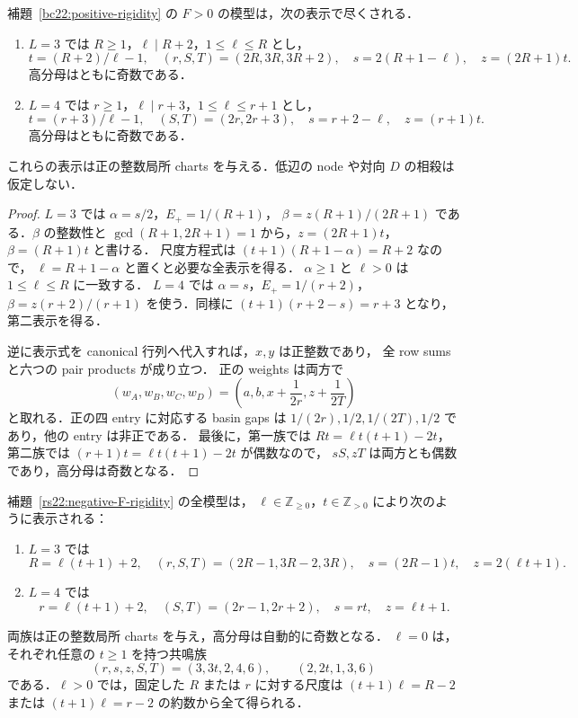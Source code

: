 \begin{proposition}[正枝の全尺度]
\label{rs22:positive-scales}
補題~\ref{bc22:positive-rigidity} の $F>0$ の模型は，次の表示で尽くされる．
\begin{enumerate}
\item $L=3$ では $R\ge1$，$\ell\mid R+2$，$1\le\ell\le R$ とし，
\[
 t=(R+2)/\ell-1,\quad
 (r,S,T)=(2R,3R,3R+2),\quad
 s=2(R+1-\ell),\quad z=(2R+1)t.
\]
高分母はともに奇数である．
\item $L=4$ では $r\ge1$，$\ell\mid r+3$，$1\le\ell\le r+1$ とし，
\[
 t=(r+3)/\ell-1,\quad (S,T)=(2r,2r+3),\quad
 s=r+2-\ell,\quad z=(r+1)t.
\]
高分母はともに奇数である．
\end{enumerate}
これらの表示は正の整数局所 charts を与える．低辺の node や対向 $D$ の相殺は仮定しない．
\end{proposition}

\begin{proof}
$L=3$ では $\alpha=s/2$，$E_+=1/(R+1)$，
$\beta=z(R+1)/(2R+1)$ である．$\beta$ の整数性と
$\gcd(R+1,2R+1)=1$ から，$z=(2R+1)t$，$\beta=(R+1)t$ と書ける．
尺度方程式は $(t+1)(R+1-\alpha)=R+2$ なので，
$\ell=R+1-\alpha$ と置くと必要な全表示を得る．
$\alpha\ge1$ と $\ell>0$ は $1\le\ell\le R$ に一致する．
$L=4$ では $\alpha=s$，$E_+=1/(r+2)$，
$\beta=z(r+2)/(r+1)$ を使う．同様に
$(t+1)(r+2-s)=r+3$ となり，第二表示を得る．

逆に表示式を canonical 行列へ代入すれば，$x,y$ は正整数であり，
全 row sums と六つの pair products が成り立つ．
正の weights は両方で
\[
 (w_A,w_B,w_C,w_D)=
 \left(a,b,x+\frac1{2r},z+\frac1{2T}\right)
\]
と取れる．正の四 entry に対応する basin gaps は
$1/(2r),1/2,1/(2T),1/2$ であり，他の entry は非正である．
最後に，第一族では $Rt=\ell t(t+1)-2t$，
第二族では $(r+1)t=\ell t(t+1)-2t$ が偶数なので，
$sS,zT$ は両方とも偶数であり，高分母は奇数となる．
\end{proof}

\begin{proposition}
\label{rs22:negative-F-scales}
補題~\ref{rs22:negative-F-rigidity} の全模型は，
$\ell\in\mathbb Z_{\ge0}$，$t\in\mathbb Z_{>0}$ により次のように表示される：
\begin{enumerate}
 \item $L=3$ では
 \[
 R=\ell(t+1)+2,\quad (r,S,T)=(2R-1,3R-2,3R),\quad
 s=(2R-1)t,\quad z=2(\ell t+1).
 \]
 \item $L=4$ では
 \[
 r=\ell(t+1)+2,\quad (S,T)=(2r-1,2r+2),\quad
 s=rt,\quad z=\ell t+1.
 \]
\end{enumerate}
両族は正の整数局所 charts を与え，高分母は自動的に奇数となる．
$\ell=0$ は，それぞれ任意の $t\ge1$ を持つ共鳴族
\[
 (r,s,z,S,T)=(3,3t,2,4,6),\qquad(2,2t,1,3,6)
\]
である．$\ell>0$ では，固定した $R$ または $r$ に対する尺度は
$(t+1)\ell=R-2$ または $(t+1)\ell=r-2$ の約数から全て得られる．
\end{proposition}

